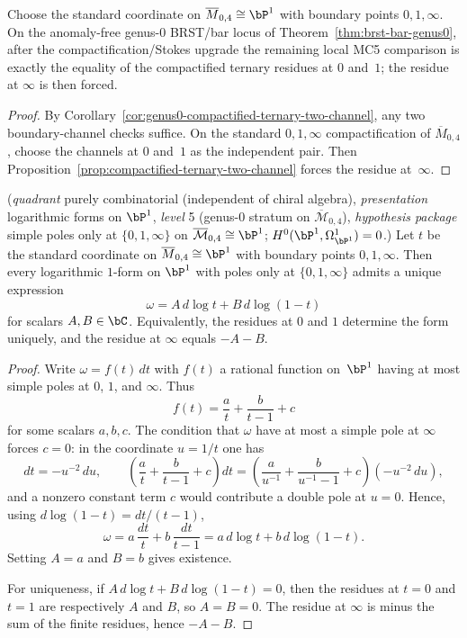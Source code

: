 \begin{corollary}
\label{cor:genus0-standard-chart-two-residues}
Choose the standard coordinate on
$\overline{M}_{0,4} \cong \bP^1$ with boundary points
$0,1,\infty$. On the anomaly-free genus-$0$ BRST/bar locus of
Theorem~\ref{thm:brst-bar-genus0}, after the compactification/Stokes
upgrade the remaining local MC5 comparison is exactly the equality of
the compactified ternary residues at $0$ and~$1$; the residue at
$\infty$ is then forced.
\end{corollary}

\begin{proof}
By Corollary~\ref{cor:genus0-compactified-ternary-two-channel}, any two
boundary-channel checks suffice. On the standard
$0,1,\infty$ compactification of $\overline{M}_{0,4}$, choose
the channels at $0$ and~$1$ as the independent pair. Then
Proposition~\ref{prop:compactified-ternary-two-channel} forces the
residue at~$\infty$.
\end{proof}

\begin{proposition}
\label{prop:m04-standard-log-basis}
\textup{(}\emph{quadrant} purely combinatorial
\textup{(}independent of chiral algebra\textup{)},
\emph{presentation} logarithmic forms on $\bP^1$,
\emph{level} 5 \textup{(}genus-$0$ stratum on
$\overline{\mathcal{M}}_{0,4}$\textup{)},
\emph{hypothesis package} simple poles only at $\{0, 1, \infty\}$ on
$\overline{\mathcal{M}}_{0,4} \cong \bP^1$;
$H^0(\bP^1, \Omega^1_{\bP^1}) = 0$.\textup{)}
Let $t$ be the standard coordinate on
$\overline{M}_{0,4} \cong \bP^1$ with boundary points
$0,1,\infty$. Then every logarithmic $1$-form on
$\bP^1$ with poles only at $\{0,1,\infty\}$ admits a unique
expression
\[
\omega = A\, d\log t + B\, d\log(1-t)
\]
for scalars $A,B \in \bC$.
Equivalently, the residues at $0$ and $1$ determine the form
uniquely, and the residue at $\infty$ equals $-A-B$.
\end{proposition}

\begin{proof}
Write $\omega = f(t)\,dt$ with $f(t)$ a rational function on~$\bP^1$
having at most simple poles at $0$, $1$, and $\infty$.
Thus
\[
f(t)=\frac{a}{t}+\frac{b}{t-1}+c
\]
for some scalars $a,b,c$. The condition that $\omega$ have at most a
simple pole at $\infty$ forces $c=0$: in the coordinate $u=1/t$ one
has
\[
dt = -u^{-2}\,du,\qquad
\left(\frac{a}{t}+\frac{b}{t-1}+c\right)dt
= \left(\frac{a}{u^{-1}}+\frac{b}{u^{-1}-1}+c\right)(-u^{-2}\,du),
\]
and a nonzero constant term $c$ would contribute a double pole at
$u=0$.
Hence, using \(d\log(1-t)=dt/(t-1)\),
\[
\omega = a\,\frac{dt}{t}+b\,\frac{dt}{t-1}
= a\, d\log t + b\, d\log(1-t).
\]
Setting $A=a$ and $B=b$ gives existence.

For uniqueness, if
$A\, d\log t + B\, d\log(1-t)=0$, then the residues at
$t=0$ and $t=1$ are respectively $A$ and $B$, so $A=B=0$.
The residue at $\infty$ is minus the sum of the finite residues, hence
$-A-B$.
\end{proof}


